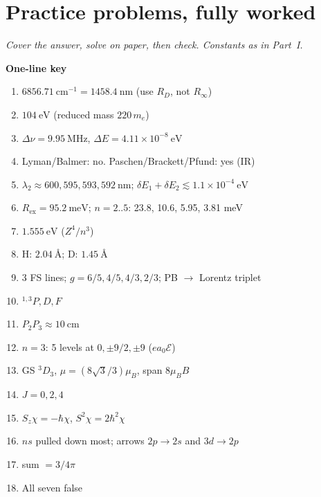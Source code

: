 \documentclass[11pt,a4paper]{article}
\begin{document}
\newpage
\section{Practice problems, fully worked}

\noindent\textit{Cover the answer, solve on paper, then check. Constants as in Part~I.}

\begin{ansbox}
\textbf{One-line key}
\begin{enumerate}[leftmargin=1.6em]
\item \(6856.71~\mathrm{cm}^{-1}=1458.4~\mathrm{nm}\) (use \(R_D\), not \(R_\infty\))
\item \(104~\mathrm{eV}\) (reduced mass \(220\,m_e\))
\item \(\Delta\nu=9.95~\mathrm{MHz}\), \(\Delta E=4.11\times 10^{-8}~\mathrm{eV}\)
\item Lyman/Balmer: no. Paschen/Brackett/Pfund: yes (IR)
\item \(\lambda_2\approx 600,595,593,592~\mathrm{nm}\); \(\delta E_1+\delta E_2\lesssim 1.1\times 10^{-4}~\mathrm{eV}\)
\item \(R_{\mathrm{ex}}=95.2~\mathrm{meV}\); \(n=2..5\): 23.8, 10.6, 5.95, 3.81 meV
\item \(1.555~\mathrm{eV}\) (\(Z^4/n^3\))
\item H: \(2.04~\text{\AA}\); D: \(1.45~\text{\AA}\)
\item 3 FS lines; \(g=6/5,4/5,4/3,2/3\); PB \(\to\) Lorentz triplet
\item \({}^{1,3}P,D,F\)
\item \(P_2P_3\approx 10~\mathrm{cm}\)
\item \(n=3\): 5 levels at \(0,\pm 9/2,\pm 9\) (\(e a_0\mathcal{E}\))
\item GS \({}^3D_3\), \(\mu=(8\sqrt{3}/3)\mu_B\), span \(8\mu_B B\)
\item \(J=0,2,4\)
\item \(S_z\chi=-\hbar\chi\), \(S^2\chi=2\hbar^2\chi\)
\item \(ns\) pulled down most; arrows \(2p\to 2s\) and \(3d\to 2p\)
\item sum \(=3/4\pi\)
\item All seven false
\end{enumerate}
\end{ansbox}
\end{document}
